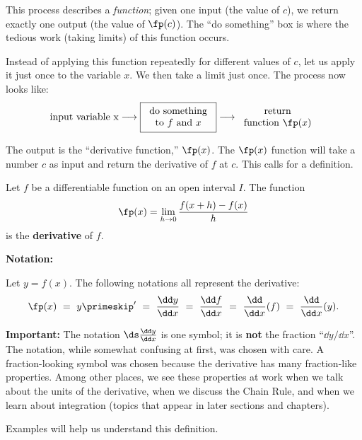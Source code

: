 This process describes a \emph{function}; given one input (the value of $c$), we return exactly one output (the value of $\fp(c)$). The ``do something'' box is where the tedious work (taking limits) of this function occurs. 

Instead of applying this function repeatedly for different values of $c$, let us apply it just once to the variable $x$. We then take a limit just once. The process now looks like:
\[
\text{input variable x}
\longrightarrow
\fbox{\begin{tabular}{c}do something\\to $f$ and $x$\end{tabular}}
\longrightarrow
\begin{tabular}{c}return\\function $\fp(x)$\end{tabular}
\]

The output is the ``derivative function,'' $\fp(x)$. The $\fp(x)$ function will take a number $c$ as input and return the derivative of $f$ at $c$. This calls for a definition.

\begin{definition}\label{def:the_derivative}
Let $f$ be a differentiable function on an open interval $I$. The function
\[\fp(x) = \lim_{h\to 0} \frac{f(x+h)-f(x)}{h}\]
is the \textbf{derivative} of $f$.\bigbreak

\textbf{Notation:}

Let $y = f(x)$. The following notations all represent the derivative:
\[\fp(x)\ =\ y\primeskip'\ =\ \frac{\dd y}{\dd x}\ =\ \frac{\dd f}{\dd x}\ =\ \frac{\dd}{\dd x}(f)\ =\ \frac{\dd}{\dd x}(y).\]
\end{definition}

\noindent
\textbf{Important:} The notation $\ds \frac{\dd y}{\dd x}$ is one symbol; it is \textbf{not} the fraction ``$\dd y/\dd x$''. The notation, while somewhat confusing at first, was chosen with care. A fraction-looking symbol was chosen because the derivative has many fraction-like properties. Among other places, we see these properties at work when we talk about the units of the derivative, when we discuss the Chain Rule, and when we learn about integration (topics that appear in later sections and chapters).\bigskip

Examples will help us understand this definition.

